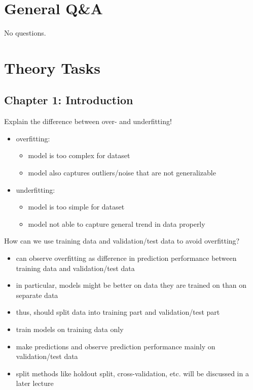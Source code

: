 \documentclass[12pt]{article}
\begin{document}
\section*{General Q\&A}

No questions.

\section*{Theory Tasks}

\subsection*{Chapter 1: Introduction}

\begin{question}
	Explain the difference between over- and underfitting!
\end{question}

\begin{itemize}[left=0pt, nosep]
	\item overfitting:
	\begin{itemize}[left=0pt, nosep]
		\item model is too complex for dataset
		\item model also captures outliers/noise that are not generalizable
	\end{itemize}
	\item underfitting:
	\begin{itemize}[left=0pt, nosep]
		\item model is too simple for dataset
		\item model not able to capture general trend in data properly
	\end{itemize}
\end{itemize}

\begin{question}
	How can we use training data and validation/test data to avoid overfitting?
\end{question}

\begin{itemize}[left=0pt, nosep]
	\item can observe overfitting as difference in prediction performance between training data and validation/test data
	\item in particular, models might be better on data they are trained on than on separate data
	\item thus, should split data into training part and validation/test part
	\item train models on training data only
	\item make predictions and observe prediction performance mainly on validation/test data
	\item split methods like holdout split, cross-validation, etc. will be discussed in a later lecture
\end{itemize}
\end{document}
